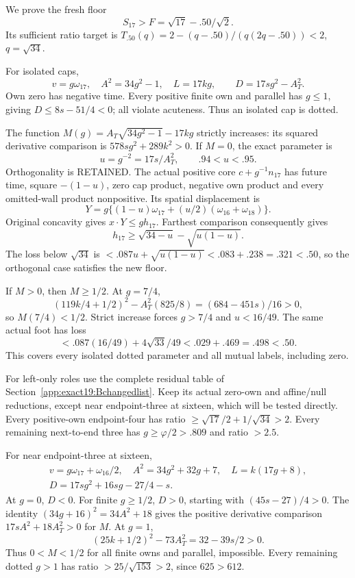 We prove the fresh floor
\[
                          S_{17}>F=\sqrt{17}-.50/\sqrt2 .
\tag{B19F50}\label{app:exact19:eq:BF50}
\]
Its sufficient ratio target is
\(T_{.50}(q)=2-(q-.50)/(q(2q-.50))<2\),
\(q=\sqrt{34}\).

For isolated caps,
\[
 v=g\omega_{17},\quad A^2=34g^2-1,\quad
             L=17kg,\qquad D=17sg^2-A_T^2 .
\]
Own zero has negative time.
Every positive finite own and
parallel has \(g\le1\), giving
\(D\le8s-51/4<0\); all violate
acuteness.
Thus an isolated cap is dotted.

The function
\(M(g)=A_T\sqrt{34g^2-1}-17kg\)
strictly increases:
its squared derivative comparison is
\(578sg^2+289k^2>0\).
If \(M=0\), the exact parameter is
\[
                          u=g^{-2}=17s/A_T^2,\qquad .94<u<.95 .
\]
Orthogonality is RETAINED.
The actual positive core
\(c+g^{-1}n_{17}\) has future time,
square \(-(1-u)\), zero cap
product, negative own product
and every omitted-wall product
nonpositive.
Its spatial displacement is
\[
 Y=g\{(1-u)\omega_{17}
                  +(u/2)(\omega_{16}+\omega_{18})\}.
\]
Original concavity gives
\(x\cdot Y\le g h_{17}\).
Farthest comparison consequently
gives
\[
                 h_{17}\ge\sqrt{34-u}-\sqrt{u(1-u)} .
\]
The loss below \(\sqrt{34}\) is
\(<.087u+\sqrt{u(1-u)}
<.083+.238=.321<.50\),
so the orthogonal case satisfies
the new floor.

If \(M>0\), then \(M\ge1/2\).
At \(g=7/4\),
\[
 (119k/4+1/2)^2-A_T^2(825/8)
                         =(684-451s)/16>0 ,
\]
so \(M(7/4)<1/2\).
Strict increase forces \(g>7/4\)
and \(u<16/49\).
The same actual foot has loss
\[
          <.087(16/49)+4\sqrt{33}/49<.029+.469=.498<.50 .
\]
This covers every isolated dotted
parameter and all mutual labels,
including zero.

For left-only roles use the
complete residual table of
Section~\ref{app:exact19:Bchangedlist}.
Keep its actual zero-own and
affine/null reductions, except
near endpoint-three at sixteen,
which will be tested directly.
Every positive-own endpoint-four
has ratio
\(\ge\sqrt{17}/2+1/\sqrt{34}>2\).
Every remaining next-to-end
three has \(g\ge\varphi/2>.809\)
and ratio \(>2.5\).

For near endpoint-three at sixteen,
\[
\begin{gathered}
 v=g\omega_{17}+\omega_{16}/2,\quad
 A^2=34g^2+32g+7,\quad L=k(17g+8),\\
                   D=17sg^2+16sg-27/4-s .
\end{gathered}
\]
At \(g=0\), \(D<0\).
For finite \(g\ge1/2\), \(D>0\),
starting with \((45s-27)/4>0\).
The identity
\((34g+16)^2=34A^2+18\)
gives the positive derivative
comparison \(17sA^2+18A_T^2>0\)
for \(M\).
At \(g=1\),
\[
                         (25k+1/2)^2-73A_T^2=32-39s/2>0 .
\]
Thus \(0<M<1/2\) for all finite
owns and parallel, impossible.
Every remaining dotted \(g>1\)
has ratio \(>25/\sqrt{153}>2\),
since \(625>612\).

